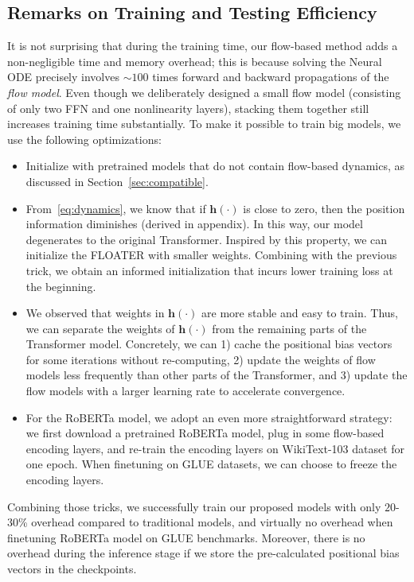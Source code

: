 \documentclass[11pt]{article}
\def\vh{{\bm{h}}}
\begin{document}
\subsection{Remarks on Training and Testing Efficiency}
It is not surprising that during the training time, our flow-based method adds a non-negligible time and memory overhead; this is because solving the Neural ODE precisely involves ${\sim}100$ times forward and backward propagations of the \emph{flow model}. Even though we deliberately designed a small flow model (consisting of only two FFN and one nonlinearity layers), stacking them together still increases training time substantially. To make it possible to train big models, we use the following optimizations:
\begin{itemize}[nosep,leftmargin=1em,labelwidth=*,align=left]
    \item Initialize with pretrained models that do not contain flow-based dynamics, as discussed in Section~\ref{sec:compatible}.
    \item From~\eqref{eq:dynamics}, we know that if $\vh(\cdot)$ is close to zero, then the position information diminishes (derived in appendix). In this way, our model degenerates to the original Transformer. Inspired by this property, we can initialize the FLOATER with smaller weights. Combining with the previous trick, we obtain an informed initialization that incurs lower training loss at the beginning.
    \item We observed that weights in $\vh(\cdot)$ are more stable and easy to train. Thus, we can separate the weights of $\vh(\cdot)$ from the remaining parts of the Transformer model. Concretely, we can 1) cache the positional bias vectors for some iterations without re-computing, 2) update the weights of flow models less frequently than other parts of the Transformer, and 3) update the flow models with a larger learning rate to accelerate convergence.
    \item For the RoBERTa model, we adopt an even more straightforward strategy: we first download a pretrained RoBERTa model, plug in some flow-based encoding layers, and re-train the encoding layers on WikiText-103 dataset for one epoch. When finetuning on GLUE datasets, we can choose to freeze the encoding layers.
\end{itemize}
Combining those tricks, we successfully train our proposed models with only $20$-$30$\% overhead compared to traditional models, and virtually no overhead when finetuning RoBERTa model on GLUE benchmarks. Moreover, there is no overhead during the inference stage if we store the pre-calculated positional bias vectors in the checkpoints.
\end{document}
